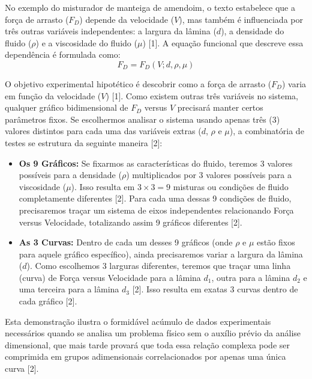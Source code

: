 No exemplo do misturador de manteiga de amendoim, o texto estabelece que a força de arrasto ($F_D$) depende da velocidade ($V$), mas também é influenciada por três outras variáveis independentes: a largura da lâmina ($d$), a densidade do fluido ($\rho$) e a viscosidade do fluido ($\mu$) [1]. A equação funcional que descreve essa dependência é formulada como:
$$ F_D = F_D(V; d, \rho, \mu) $$

O objetivo experimental hipotético é descobrir como a força de arrasto ($F_D$) varia em função da velocidade ($V$) [1]. Como existem outras três variáveis no sistema, qualquer gráfico bidimensional de $F_D$ versus $V$ precisará manter certos parâmetros fixos. Se escolhermos analisar o sistema usando apenas três (3) valores distintos para cada uma das variáveis extras ($d$, $\rho$ e $\mu$), a combinatória de testes se estrutura da seguinte maneira [2]:

\begin{itemize}
    \item \textbf{Os 9 Gráficos:} Se fixarmos as características do fluido, teremos 3 valores possíveis para a densidade ($\rho$) multiplicados por 3 valores possíveis para a viscosidade ($\mu$). Isso resulta em $3 \times 3 = 9$ misturas ou condições de fluido completamente diferentes [2]. Para cada uma dessas 9 condições de fluido, precisaremos traçar um sistema de eixos independentes relacionando Força versus Velocidade, totalizando assim 9 gráficos diferentes [2].
    
    \item \textbf{As 3 Curvas:} Dentro de cada um desses 9 gráficos (onde $\rho$ e $\mu$ estão fixos para aquele gráfico específico), ainda precisaremos variar a largura da lâmina ($d$). Como escolhemos 3 larguras diferentes, teremos que traçar uma linha (curva) de Força versus Velocidade para a lâmina $d_1$, outra para a lâmina $d_2$ e uma terceira para a lâmina $d_3$ [2]. Isso resulta em exatas 3 curvas dentro de cada gráfico [2].
\end{itemize}

Esta demonstração ilustra o formidável acúmulo de dados experimentais necessários quando se analisa um problema físico sem o auxílio prévio da análise dimensional, que mais tarde provará que toda essa relação complexa pode ser comprimida em grupos adimensionais correlacionados por apenas uma única curva [2].